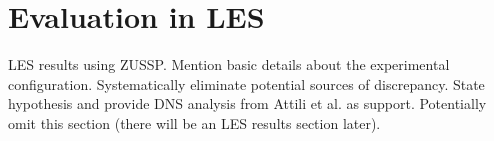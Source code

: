 \section{Evaluation in LES}
\label{sec:subfilter:leszussp}

LES results using ZUSSP. Mention basic details about the experimental configuration. Systematically eliminate potential sources of discrepancy. State hypothesis and provide DNS analysis from Attili et al. as support. Potentially omit this section (there will be an LES results section later).
